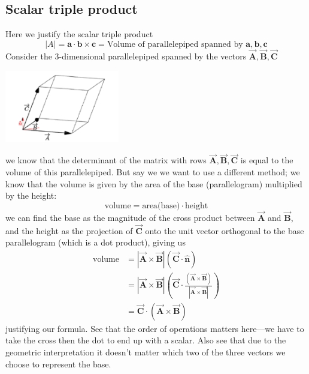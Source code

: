 \documentclass{report}
\begin{document}
\subsection{Scalar triple product}
Here we justify the scalar triple product
\begin{equation*}
|A|=\bm{a}\cdot\bm{b}\times\bm{c}=\text{Volume of parallelepiped spanned by $\bm{a},\bm{b},\bm{c}$}
\end{equation*}
Consider the 3-dimensional parallelepiped spanned by the vectors $\overrightarrow{\bm{A}},\overrightarrow{\bm{B}},\overrightarrow{\bm{C}}$
\begin{center}
\includegraphics[width=5cm]{104}
\end{center}
we know that the determinant of the matrix with rows 
$\overrightarrow{\bm{A}},\overrightarrow{\bm{B}},\overrightarrow{\bm{C}}$
is equal to the volume of this parallelepiped. But say we we want to use a different method; we know that the volume is given by the area
of the base (parallelogram) multiplied by the height:
\begin{equation*}
\text{volume}=\text{area(base)}\cdot\text{height}
\end{equation*}
we can find the base as the magnitude of the cross product between $\overrightarrow{\bm{A}}$ and $\overrightarrow{\bm{B}}$, and the 
height as the projection of $\overrightarrow{\bm{C}}$ onto the unit vector orthogonal to the base parallelogram (which is a dot product), giving
us
\begin{align*}
\text{volume}&=|\overrightarrow{\bm{A}}\times\overrightarrow{\bm{B}}|(\overrightarrow{\bm{C}}\cdot\hat{\bm{n}})\\
&=|\overrightarrow{\bm{A}}\times\overrightarrow{\bm{B}}|\left(\overrightarrow{\bm{C}}\cdot
\frac{(\overrightarrow{\bm{A}}\times\overrightarrow{\bm{B}})}{|\overrightarrow{\bm{A}}\times\overrightarrow{\bm{B}}|}\right)\\
&=\overrightarrow{\bm{C}}\cdot(\overrightarrow{\bm{A}}\times\overrightarrow{\bm{B}})
\end{align*}
justifying our formula. See that the order of operations matters here---we have to take the cross then the dot to end up with a scalar.
Also see that due to the geometric interpretation it doesn't matter which two of the three vectors we choose to represent the base.\\
\end{document}
